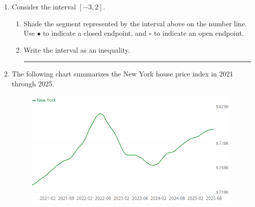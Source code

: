 \documentclass[10pt]{article}
\begin{document}
\endgroup
\vspace{1em}
\begin{enumerate}

\item Consider the interval $[-3,2]$.
\begin{enumerate}
\item Shade the segment represented by the interval above on the number line. Use $\bullet$ to indicate a closed endpoint, and $\circ$ to indicate an open endpoint.
\vspace{1em}
\begin{center}
\end{center}
\vspace{2em}
\item Write the interval as an inequality. \rule{12em}{0.1pt}

\end{enumerate}
\item The following chart summarizes the New York house price index in 2021 through 2025.
\begin{figure}[h]
\centering
\includegraphics[width=.6\textwidth]{new-york-house-price-2021-2025.png}
\end{figure}


\end{enumerate}
\end{document}
